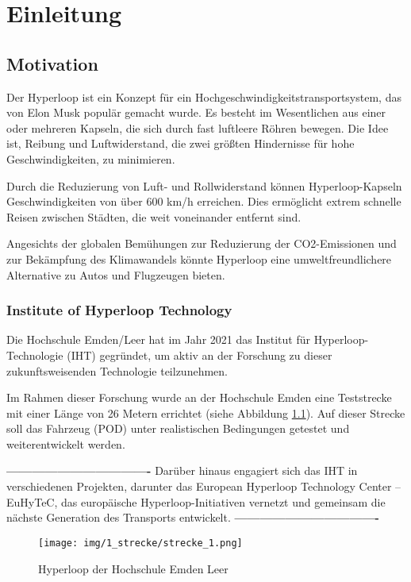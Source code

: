\chapter{Einleitung}

\section{Motivation}
Der Hyperloop ist ein Konzept für ein Hochgeschwindigkeitstransportsystem, das von Elon Musk \cite{tesla:Hyperloop_impact} populär gemacht wurde. Es besteht im Wesentlichen aus einer oder mehreren Kapseln, die sich durch fast luftleere Röhren bewegen. Die Idee ist, Reibung und Luftwiderstand, die zwei größten Hindernisse für hohe Geschwindigkeiten, zu minimieren.

Durch die Reduzierung von Luft- und Rollwiderstand können Hyperloop-Kapseln Geschwindigkeiten von über 600 km/h erreichen. Dies ermöglicht extrem schnelle Reisen zwischen Städten, die weit voneinander entfernt sind.

Angesichts der globalen Bemühungen zur Reduzierung der CO2-Emissionen und zur Bekämpfung des Klimawandels könnte Hyperloop eine umweltfreundlichere Alternative zu Autos und Flugzeugen bieten.



\subsection{Institute of Hyperloop Technology}
Die Hochschule Emden/Leer hat im Jahr 2021 das Institut für Hyperloop-Technologie (IHT) gegründet, um aktiv an der Forschung zu dieser zukunftsweisenden Technologie teilzunehmen.

Im Rahmen dieser Forschung wurde an der Hochschule Emden eine Teststrecke mit einer Länge von 26 Metern errichtet (siehe Abbildung \ref{img_1_1:strecke}). Auf dieser Strecke soll das Fahrzeug (POD) unter realistischen Bedingungen getestet und weiterentwickelt werden.

\textbf{----------------------------------}\newline
Darüber hinaus engagiert sich das IHT in verschiedenen Projekten, darunter das \frqq European Hyperloop Technology Center – EuHyTeC\flqq, das europäische Hyperloop-Initiativen vernetzt und gemeinsam die nächste Generation des Transports entwickelt.\newline
\textbf{----------------------------------}

\begin{figure}[ht]
	\begin{center}
		\texttt{[image: img/1\_strecke/strecke\_1.png]}
		\caption{Hyperloop der Hochschule Emden Leer}
		\label{img_1_1:strecke}
	\end{center}
\end{figure}
\newpage

